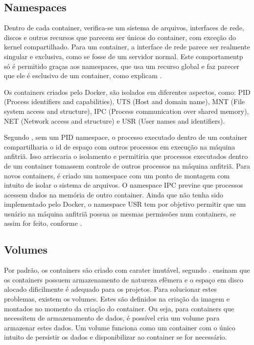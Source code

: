\documentclass[
	12pt,				%
	openright,			%
	oneside,			%
	a4paper,			%
	chapter=TITLE,		%
	section=TITLE,		%
	english,			%
	french,				%
	spanish,			%
	brazil				%
	]{abntex2}
\begin{document}
\subsection{Namespaces}

Dentro de cada container, verifica-se um sistema de arquivos, interfaces de rede, discos e outros recursos que parecem ser únicos do container, com exceção do kernel compartilhado. Para um container, a interface de rede parece ser realmente singular e exclusiva, como se fosse de um servidor normal. Este comportamentp só é permitido graças aos namespaces, que usa um recurso global e faz parecer que ele é esclusivo de um container, como explicam .

Os containers criados pelo Docker, são isolados em diferentes aspectos, como: PID (Process identifiers and capabilities), UTS (Host and domain name), MNT (File system access and structure), IPC (Process communication over shared memory), NET (Network access and structure) e USR (User names and identifiers). 

Segundo , sem um PID namespace, o processo executado dentro de um container compartilharia o id de espaço com outros processos em execução na máquina anfitriã. Isso arriscaria o isolamento e permitiria que processos executados dentro de um container tomassem controle de outros processos na máquina anfitriã. Para novos containers, é criado um namespace com um ponto de montagem com intuito de isolar o sistema de arquivos. O namespace IPC previne que processos acessem dados na memória de outro container. Ainda que não tenha sido implementado pelo Docker, o namespace USR tem por objetivo permitir que um usuário na máquina anfitriã possua as mesmas permissões num containers, se assim for feito, conforme . 

\subsection{Volumes}

Por padrão, os containers são criado com carater imutável, segundo .  ensinam que os containers possuem armazenamento de natureza efêmera e o espaço em disco alocado dificilmente é adequado para os projetos. Para solucionar estes problemas, existem os volumes. Estes são definidos na criação da imagem e montados no momento da criação do container. Ou seja, para containers que necessitem de armazenamento de dados, é possível cria um volume para armazenar estes dados. Um volume funciona como um container com o único intuito de persistir os dados e disponibilizar ao container se for necessário.
\end{document}

